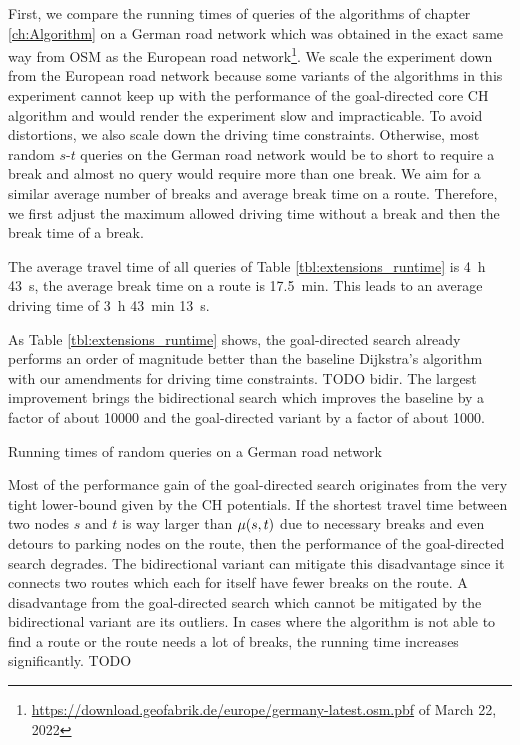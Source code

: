 First, we compare the running times of queries of the algorithms of chapter \ref{ch:Algorithm} on a German road network which was obtained in the exact same way from OSM as the European road network\footnote{\url{https://download.geofabrik.de/europe/germany-latest.osm.pbf} of March 22, 2022}. We scale the experiment down from the European road network because some variants of the algorithms in this experiment cannot keep up with the performance of the goal-directed core CH algorithm and would render the experiment slow and impracticable. To avoid distortions, we also scale down the driving time constraints. Otherwise, most random $s$-$t$ queries on the German road network would be to short to require a break and almost no query would require more than one break. We aim for a similar average number of breaks and average break time on a route. Therefore, we first adjust the maximum allowed driving time without a break and then the break time of a break.


The average travel time of all queries of Table \ref{tbl:extensions_runtime} is \SI{4}{\hour} \SI{43}{\second}, the average break time on a route is \SI{17.5}{\minute}. This leads to an average driving time of \SI{3}{\hour} \SI{43}{\minute} \SI{13}{\second}.

As Table \ref{tbl:extensions_runtime} shows, the goal-directed search already performs an order of magnitude better than the baseline Dijkstra's algorithm with our amendments for driving time constraints. TODO bidir. The largest improvement brings the bidirectional search which improves the baseline by a factor of about \num{10000} and the goal-directed variant by a factor of about \num{1000}.

\begin{table}[hbtp]
	\centering
	
	\caption{Running times of random queries on a German road network}
	\label{tbl:extensions_runtime}
\end{table}

Most of the performance gain of the goal-directed search originates from the very tight lower-bound given by the CH potentials. If the shortest travel time between two nodes $s$ and $t$ is way larger than $\mu(s,t)$ due to necessary breaks and even detours to parking nodes on the route, then the performance of the goal-directed search degrades. The bidirectional variant can mitigate this disadvantage since it connects two routes which each for itself have fewer breaks on the route. A disadvantage from the goal-directed search which cannot be mitigated by the bidirectional variant are its outliers. In cases where the algorithm is not able to find a route or the route needs a lot of breaks, the running time increases significantly. TODO

